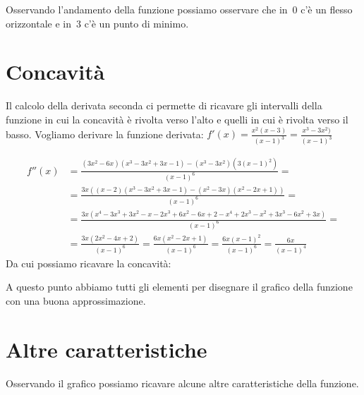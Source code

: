 Osservando l'andamento della funzione possiamo osservare che in~0 c'è un 
flesso orizzontale e in~3 c'è un punto di minimo.

\begin{comment}

\begin{minipage}{.60\linewidth}
\end{minipage}
\hfill
\begin{minipage}{.38\linewidth}
 \begin{center}
\segnofunzionea
 \end{center}
\end{minipage}

\end{comment}

\section{Concavità}
\label{sec:04_concavita}
Il calcolo della derivata seconda ci permette di ricavare gli intervalli 
della funzione in cui la concavità è rivolta verso l'alto e quelli in cui è 
rivolta verso il basso. Vogliamo derivare la funzione derivata:
\(f'(x)=\frac{x^2(x-3)}{(x-1)^3}=\frac{x^3-3x^2)}{(x-1)^3}\)

\begin{align*}
f''(x) &= \frac{(3x^2 -6x)(x^3-3x^2+3x-1)-(x^3-3x^2)(3(x-1)^2)}{(x-1)^6} =\\
       &= \frac{3x((x -2)(x^3-3x^2+3x-1)-(x^2-3x)(x^2-2x+1))}{(x-1)^6} =\\
       &= \frac{3x(x^4-3x^3+3x^2-x-2x^3+6x^2-6x+2-x^4+2x^3-x^2+3x^3-6x^2+3x)}
               {(x-1)^6} =\\
       &= \frac{3x(2x^2-4x+2)}{(x-1)^6} = \frac{6x(x^2-2x+1)}{(x-1)^6} =
          \frac{6x(x-1)^2}{(x-1)^6} = \frac{6x}{(x-1)^4}
\end{align*}
Da cui possiamo ricavare la concavità:
\begin{center}
 \segnoderivatasecondaa
\end{center}

A questo punto abbiamo tutti gli elementi per disegnare il grafico della 
funzione con una buona approssimazione.

\section{Altre caratteristiche}
\label{sec:altre_caratteristche}
Osservando il grafico possiamo ricavare alcune altre caratteristiche della 
funzione.

